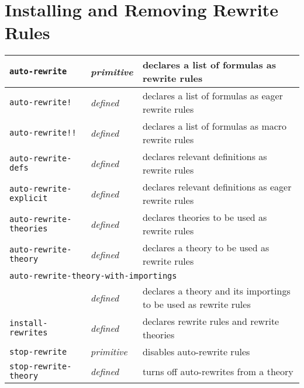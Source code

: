 \documentclass[12pt,twoside]{book}
\makeatletter
\newcommand{\indtt}[1]{\texttt{#1}\index{#1@{\texttt{#1}}}}  %
\newcommand{\indttbang}[1]{\texttt{#1!}\index{#1"!@{\texttt{#1"!}}}}
\newcommand{\indttdbang}[1]{\texttt{#1!!}\index{#1"!"!@{\texttt{#1"!"!}}}}
\makeatother
\begin{document}
\section{Installing and Removing Rewrite Rules}
\begin{tabular}{|l|l|p{3.0in}|}\hline
\indtt{auto-rewrite} & \emph{primitive} %
&declares a list of formulas as rewrite rules\\\hline
\indttbang{auto-rewrite} & \emph{defined} %
& declares a list of formulas as eager rewrite rules\\\hline
\indttdbang{auto-rewrite} & \emph{defined} %
& declares a list of formulas as macro rewrite rules\\\hline
\indtt{auto-rewrite-defs} & \emph{defined} %
& declares relevant definitions  as rewrite rules\\\hline
\indtt{auto-rewrite-explicit} & \emph{defined} %
& declares relevant definitions  as eager rewrite rules\\\hline
\indtt{auto-rewrite-theories} & \emph{defined} &  declares theories to be used as rewrite rules\\\hline
\indtt{auto-rewrite-theory} & \emph{defined} &  declares a theory to be
used as rewrite rules\\\hline
\multicolumn{3}{|l|}{\indtt{auto-rewrite-theory-with-importings}}\\
& \emph{defined} &  declares a theory and its importings to be
used as rewrite rules\\\hline
\indtt{install-rewrites} & \emph{defined} & declares rewrite rules and
rewrite theories \\\hline 
\indtt{stop-rewrite} & \emph{primitive} & disables auto-rewrite rules \\\hline
\indtt{stop-rewrite-theory} & \emph{defined} & turns off auto-rewrites from a theory\\\hline
\end{tabular}
\end{document}
